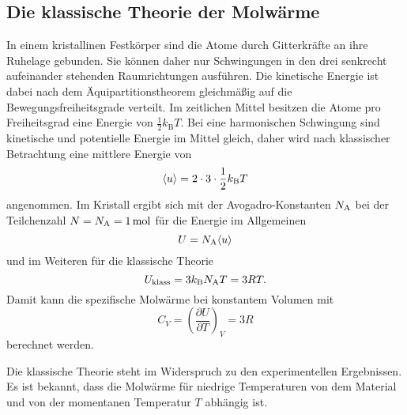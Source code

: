 \subsection{Die klassische Theorie der Molwärme}
In einem kristallinen Festkörper sind die Atome durch Gitterkräfte an ihre Ruhelage gebunden. 
Sie können daher nur Schwingungen in den drei senkrecht aufeinander stehenden Raumrichtungen ausführen. 
Die kinetische Energie ist dabei nach dem Äquipartitionstheorem gleichmäßig auf die Bewegungsfreiheitsgrade verteilt. 
Im zeitlichen Mittel besitzen die Atome 
pro Freiheitsgrad
eine Energie von $\frac{1}{2}k_\text{B}T$. 
Bei eine harmonischen Schwingung sind kinetische und potentielle Energie im Mittel gleich, 
daher wird nach klassischer Betrachtung eine mittlere Energie von
\begin{equation*}
	\langle u \rangle = 2\cdot3\cdot\frac{1}{2}k_\text B T
\end{equation*}
angenommen.
Im Kristall ergibt sich mit der Avogadro-Konstanten $N_\text A$ bei der Teilchenzahl $N = N_\text A = \SI{1}{mol}$ für die Energie im Allgemeinen
\begin{equation}
	U = N_\text A \langle u \rangle
	\label{eq:gesamtenergie}
\end{equation}
und im Weiteren für die klassische Theorie
\begin{equation}
	U_\text{klass} = 3k_\text B N_\text A T = 3RT.
\end{equation}
Damit kann die spezifische Molwärme bei konstantem Volumen mit
\begin{equation}
	C_V = \left(\frac{\partial U}{\partial T}\right)_V = 3R
\end{equation}
berechnet werden.

Die klassische Theorie steht im Widerspruch zu den experimentellen Ergebnissen.
Es ist bekannt, 
dass die Molwärme für niedrige Temperaturen 
von dem Material und von der momentanen Temperatur $T$ abhängig ist.


